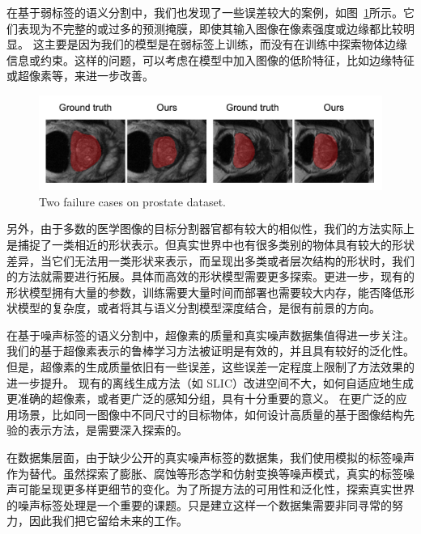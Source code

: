 在基于弱标签的语义分割中，我们也发现了一些误差较大的案例，如图~\ref{fig:failure}所示。它们表现为不完整的或过多的预测掩膜，即使其输入图像在像素强度或边缘都比较明显。
这主要是因为我们的模型是在弱标签上训练，而没有在训练中探索物体边缘信息或约束。这样的问题，可以考虑在模型中加入图像的低阶特征，比如边缘特征或超像素等，来进一步改善。
    \begin{figure}[tbp]
        \centering 
        \includegraphics[width=1.0\textwidth]{img/c3/failure.png}
        {Two failure cases on prostate dataset.}
        \label{fig:failure}
    \end{figure}

另外，由于多数的医学图像的目标分割器官都有较大的相似性，我们的方法实际上是捕捉了一类相近的形状表示。但真实世界中也有很多类别的物体具有较大的形状差异，当它们无法用一类形状来表示，而呈现出多类或者层次结构的形状时，我们的方法就需要进行拓展。具体而高效的形状模型需要更多探索。更进一步，现有的形状模型拥有大量的参数，训练需要大量时间而部署也需要较大内存，能否降低形状模型的复杂度，或者将其与语义分割模型深度结合，是很有前景的方向。

在基于噪声标签的语义分割中，超像素的质量和真实噪声数据集值得进一步关注。
我们的基于超像素表示的鲁棒学习方法被证明是有效的，并且具有较好的泛化性。但是，超像素的生成质量依旧有一些误差，这些误差一定程度上限制了方法效果的进一步提升。
现有的离线生成方法（如 SLIC）改进空间不大，如何自适应地生成更准确的超像素，或者更广泛的感知分组，具有十分重要的意义。
在更广泛的应用场景，比如同一图像中不同尺寸的目标物体，如何设计高质量的基于图像结构先验的表示方法，是需要深入探索的。

在数据集层面，由于缺少公开的真实噪声标签的数据集，我们使用模拟的标签噪声作为替代。虽然探索了膨胀、腐蚀等形态学和仿射变换等噪声模式，真实的标签噪声可能呈现更多样更细节的变化。为了所提方法的可用性和泛化性，探索真实世界的噪声标签处理是一个重要的课题。只是建立这样一个数据集需要非同寻常的努力，因此我们把它留给未来的工作。